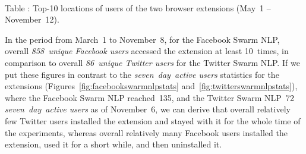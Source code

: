 \documentclass{iosart2c}
\newcommand{\tablecaption}[1]{%
  \\[1em]%
  \refstepcounter{table}%
  Table \arabic{table}: #1%
}
\begin{document}
\begin{table}
  \centering
  \qquad
  \tablecaption{Top-10 locations of users of the two browser extensions (May~1 -- November~12).}
  \label{tbl:locations}
\end{table}

In the period from March~1 to November~8, for the Facebook Swarm NLP, overall \emph{858~unique Facebook users} accessed the extension at least 10~times, in comparison to overall \emph{86~unique Twitter users} for the Twitter Swarm NLP.
If we put these figures in contrast to the \emph{seven~day~active users} statistics for the extensions (Figures~\ref{fig:facebookswarmnlpstats} and~\ref{fig:twitterswarmnlpstats}), where the Facebook Swarm NLP reached~135, and the Twitter Swarm NLP~72 \emph{seven~day~active users} as of November~6, we can derive that overall relatively few Twitter users installed the extension and stayed with it for the whole time of the experiments, whereas overall relatively many Facebook users installed the extension, used it for a short while, and then uninstalled it.
\end{document}
